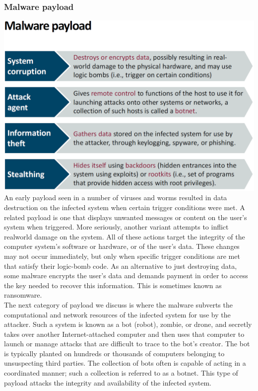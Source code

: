\documentclass[12pt]{article}
\begin{document}
 \subsubsection{Malware payload}
 \includegraphics[width=\linewidth]{./slides/L8P3MWPL.PNG}\\
 An early payload seen in a number of viruses and worms resulted in data destruction on the infected system when certain trigger conditions were met. A related payload is one that displays unwanted messages or content on the user’s system when triggered. More seriously, another variant attempts to inflict realworld damage on the system. All of these actions target the integrity of the computer system’s software or hardware, or of the user’s data. These changes may not occur immediately, but only when specific trigger conditions are met that satisfy their logic-bomb code. As an alternative to just destroying data, some malware encrypts the user’s data and demands payment in order to access the key needed to recover this information. This is sometimes known as ransomware.\\
 The next category of payload we discuss is where the malware subverts the computational and network resources of the infected system for use by the attacker. Such a system is known as a bot (robot), zombie, or drone, and secretly takes over another Internet-attached computer and then uses that computer to launch or manage attacks that are difficult to trace to the bot’s creator. The bot is typically planted on hundreds or thousands of computers belonging to unsuspecting third parties. The collection of bots often is capable of acting in a coordinated manner; such a collection is referred to as a botnet. This type of payload attacks the integrity and availability of the infected system.\\
\end{document}
